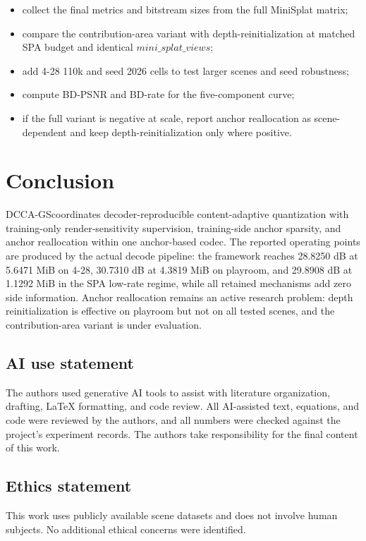 \documentclass{article}
\newcommand{\DCCA}{DCCA-GS}
\begin{document}
\begin{itemize}
\item collect the final metrics and bitstream sizes from the full MiniSplat matrix;
\item compare the contribution-area variant with depth-reinitialization at matched SPA budget and identical $mini\_splat\_views$;
\item add 4-28 110k and seed 2026 cells to test larger scenes and seed robustness;
\item compute BD-PSNR and BD-rate for the five-component curve;
\item if the full variant is negative at scale, report anchor reallocation as scene-dependent and keep depth-reinitialization only where positive.
\end{itemize}

\section{Conclusion}
\DCCA coordinates decoder-reproducible content-adaptive quantization with training-only render-sensitivity supervision, training-side anchor sparsity, and anchor reallocation within one anchor-based codec. The reported operating points are produced by the actual decode pipeline: the framework reaches 28.8250 dB at 5.6471 MiB on 4-28, 30.7310 dB at 4.3819 MiB on playroom, and 29.8908 dB at 1.1292 MiB in the SPA low-rate regime, while all retained mechanisms add zero side information. Anchor reallocation remains an active research problem: depth reinitialization is effective on playroom but not on all tested scenes, and the contribution-area variant is under evaluation.

\subsection*{AI use statement}
The authors used generative AI tools to assist with literature organization, drafting, LaTeX formatting, and code review. All AI-assisted text, equations, and code were reviewed by the authors, and all numbers were checked against the project's experiment records. The authors take responsibility for the final content of this work.

\subsection*{Ethics statement}
This work uses publicly available scene datasets and does not involve human subjects. No additional ethical concerns were identified.



\end{document}
